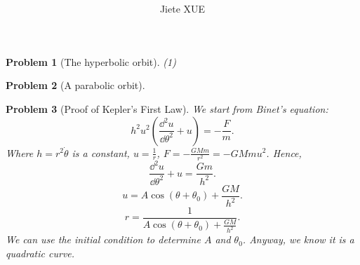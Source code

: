\documentclass{article}
\title{\textbf{\mytitle}}
\author{Jiete XUE}
\date{\mydate}
\theoremstyle{1}
\newtheorem{problem}{Problem}
\begin{document}
\maketitle
\begin{problem}[The hyperbolic orbit]
    (1)
\end{problem}
\begin{problem}[A parabolic orbit]
    
\end{problem}
\begin{problem}[Proof of Kepler's First Law]
    We start from Binet's equation:
    \begin{equation}
        h^2u^2\left(\frac{\dd^2{u}}{\dd{\theta}^2}+u\right)=-\frac{F}{m}.
    \end{equation}
    Where $h=r^2\dot{\theta}$ is a constant, $u=\frac{1}{r}$, $F=-\frac{GMm}{r^2}=-GMmu^2$. Hence,
    \begin{equation}
        \frac{\dd^2{u}}{\dd{\theta}^2}+u=\frac{Gm}{h^2}.
    \end{equation}
    \begin{equation}
        u=A\cos\left(\theta+\theta_0\right)+\frac{GM}{h^2}.
    \end{equation}
    \begin{equation}
        r=\frac{1}{A\cos\left(\theta+\theta_0\right)+\frac{GM}{h^2}}.
    \end{equation}
    We can use the initial condition to determine $A$ and $\theta_0$. Anyway, we know it is a quadratic curve.
\end{problem}
\end{document}
